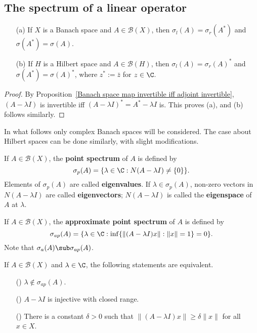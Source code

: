 \subsection{The spectrum of a linear operator}
\begin{proposition}\label{spectrum and adjoint}
\mbox{}
\begin{itemize}
\item[(a)] If $X$ is a Banach space and $A\in\mathcal{B}(X)$, then $\sigma_l(A)=\sigma_r(A^*)$ and $\sigma(A^*)=\sigma(A)$.
\item[(b)] If $H$ is a Hilbert space and $A\in\mathcal{B}(H)$, then $\sigma_l(A)=\sigma_r(A)^*$ and $\sigma(A^*)=\sigma(A)^*$, where $z^*:=\bar{z}$ for $z\in\C$.
\end{itemize}
\end{proposition}
\begin{proof}
By Proposition~\ref{Banach space map invertible iff adjoint invertible}, $(A-\lambda I)$ is invertible iff $(A-\lambda I)^*=A^*-\lambda I$ is. This proves (a), and (b) follows similarly. 
\end{proof}
In what follows only complex Banach spaces will be considered. The case about Hilbert spaces can be done similarly, with slight modifications.
\begin{definition}
If $A\in\mathcal{B}(X)$, the \textbf{point spectrum} of $A$ is defined by
\[\sigma_p(A)=\{\lambda\in\C:N(A-\lambda I)\neq\{0\}\}.\]
Elements of $\sigma_p(A)$ are called \textbf{eigenvalues}. If $\lambda\in\sigma_p(A)$, non-zero vectors in $N(A-\lambda I)$ are called \textbf{eigenvectors}; $N(A-\lambda I)$ is called the \textbf{eigenspace} of $A$ at $\lambda$.
\end{definition}
\begin{definition}
If $A\in\mathcal{B}(X)$, the \textbf{approximate point spectrum} of $A$ is defined by
\[\sigma_{ap}(A)=\{\lambda\in\C:\inf\{\|(A-\lambda I)x\|:\|x\|=1\}=0\}.\]
Note that $\sigma_{a}(A)\sub\sigma_{ap}(A)$.
\end{definition}
\begin{proposition}\label{Banach space ap spectrum char}
If $A\in\mathcal{B}(X)$ and $\lambda\in\C$, the following statements are equivalent.
\begin{itemize}
\item[(\rmnum{1})] $\lambda\notin\sigma_{ap}(A)$.
\item[(\rmnum{2})] $A-\lambda I$ is injective with closed range.
\item[(\rmnum{3})] There is a constant $\delta>0$ such that $\|(A-\lambda I)x\|\geq\delta\|x\|$ for all $x\in X$.
\end{itemize}
\end{proposition}
